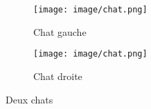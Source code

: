 \begin{figure}[ht]
	\centering
	\begin{subfigure}[c]{0.45\textwidth}
		\texttt{[image: image/chat.png]}
		\caption{Chat gauche}
	\end{subfigure}
	\hfill
	\begin{subfigure}[c]{0.45\textwidth}
		\texttt{[image: image/chat.png]}
		\caption{Chat droite}
	\end{subfigure}
			
	\caption{Deux chats}
	\label{fig:chat3}
\end{figure}